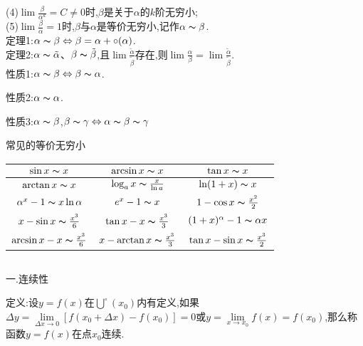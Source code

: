 \documentclass[utf8]{ctexart}
\begin{document}
(4)$\displaystyle\lim \frac{\beta}{\alpha ^k} =C\neq 0$时,$\beta $是关于$\alpha $的$k$阶无穷小;
\\

(5)$\displaystyle\lim \frac{\beta}{\alpha} =1$时,$\beta $与$\alpha $是{\heiti 等价无穷小},记作$\alpha \thicksim \beta $.
\\

定理1:$\alpha \thicksim \beta \Leftrightarrow \beta = \alpha +\circ (\alpha )$.
\\

定理2:$\alpha \thicksim \tilde{\alpha } $、$\beta  \thicksim \tilde{\beta } $,且$\displaystyle \lim \frac{\tilde{\alpha }}{\tilde{\beta }}$存在,则$\displaystyle \lim \frac{\alpha }{\beta}=\lim \frac{\tilde{\alpha }}{\tilde{\beta }}$.
\\

性质1:$\alpha \thicksim \beta \Leftrightarrow \beta \thicksim \alpha $.

性质2:$\alpha \thicksim \alpha $.

性质3:$\alpha \thicksim \beta$,$\beta \thicksim \gamma \Leftrightarrow \alpha \thicksim  \beta \thicksim  \gamma $

常见的等价无穷小

\begin{tabular}{|c|c|c|}
    \hline
    $\sin x\thicksim x$&$\arcsin  x\thicksim x$&$\tan x\thicksim x$\\
    \hline
    $\arctan x\thicksim x$&$\log_{a}x\thicksim\frac{x}{\ln a}$&$\ln (1+x)\thicksim x$\\
    \hline
    $\alpha ^x-1\thicksim x\ln \alpha$&  $e^x-1 \thicksim x$&$ 1-\cos x\thicksim \frac{x^2}{2}$\\
    \hline
    $x-\sin x\thicksim \frac{x^3}{6}$&$\tan x -x\thicksim \frac{x^3}{3}$ &$(1+x)^\alpha -1\thicksim \alpha x$\\
    \hline
    $\arcsin x-x\thicksim \frac{x^3}{6}$&$x-\arctan  x\thicksim \frac{x^3}{3}$&$\tan x-\sin x\thicksim \frac{x^3}{2}$\\
    \hline
\end{tabular}

\subsection{}

一.连续性

定义:设$y=f(x)$在$\bigcup \limits ^{\circ}(x_0)$内有定义,如果$\Delta y=\lim \limits_{\Delta x\to 0 }\left[f(x_0+\Delta x)-f(x_0)\right]=0 $或$y=\lim \limits_{x\to x_0}f(x)=f(x_0)$,那么称函数$y=f(x)$在点$x_0$连续.
\end{document}
